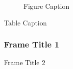 \documentclass{article}
\begin{document}
\begin{figure}
\end{figure}
\begin{figure}
\caption{Figure Caption}
\end{figure}
\begin{table}
\caption{Table Caption}
\end{table}
\begin{frame}
\frametitle{Frame Title 1}
\end{frame}
\begin{frame} {Frame Title 2}
\end{frame}
\begin{frame}
\end{frame}
\end{document}
